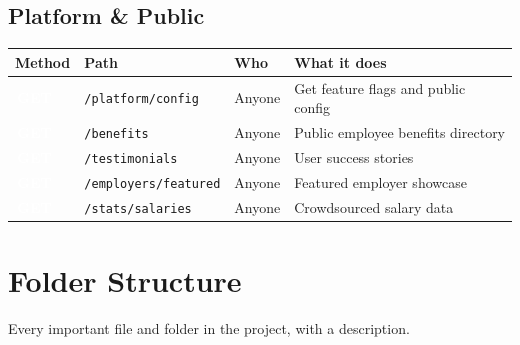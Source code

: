 \documentclass[12pt, a4paper]{report}
\newcommand{\code}[1]{\texttt{\small #1}}
\newcommand{\badge}[2]{%
  \colorbox{#1}{\textcolor{white}{\tiny\bfseries\,#2\,}}%
}
\newcommand{\GET}{\badge{successgr}{GET}}
\begin{document}
{%
\section{Platform \& Public}

\begin{longtable}{p{1.5cm}p{5.5cm}p{2.2cm}p{5.5cm}}
\toprule
\textbf{Method} & \textbf{Path} & \textbf{Who} & \textbf{What it does} \\
\midrule
\endhead
\GET & \code{/platform/config}    & Anyone & Get feature flags and public config \\
\GET & \code{/benefits}           & Anyone & Public employee benefits directory \\
\GET & \code{/testimonials}       & Anyone & User success stories \\
\GET & \code{/employers/featured} & Anyone & Featured employer showcase \\
\GET & \code{/stats/salaries}     & Anyone & Crowdsourced salary data \\
\bottomrule
\end{longtable}

} %

\chapter{Folder Structure}

Every important file and folder in the project, with a description.
\end{document}
